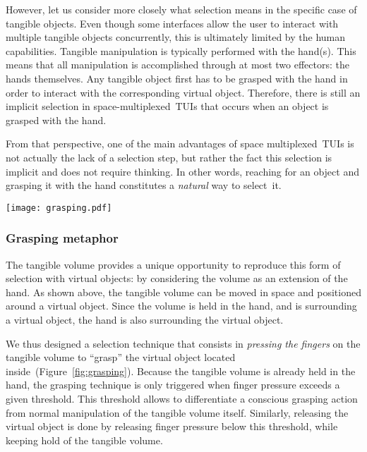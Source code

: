 \documentclass{vgtc}                         \havecopyrightspacefalse
\begin{document}
However, let us consider more closely what selection means in the specific case of tangible objects. Even though some interfaces allow the user to interact with multiple tangible objects concurrently, this is ultimately limited by the human capabilities. Tangible manipulation is typically performed with the hand(s). This means that all manipulation is accomplished through at most two effectors: the hands themselves. Any tangible object first has to be grasped with the hand in order to interact with the corresponding virtual object. Therefore, there is still an implicit selection in space-multiplexed~TUIs that occurs when an object is grasped with the hand.

From that perspective, one of the main advantages of space multiplexed~TUIs is not actually the lack of a selection step, but rather the fact this selection is implicit and does not require thinking. In other words, reaching for an object and grasping it with the hand constitutes a \emph{natural} way to select~it.

\begin{figure*}[t]
  \centering
  \texttt{[image: grasping.pdf]}
  \caption{Illustration of the different steps of object manipulation in our interface concept. First, the tangible volume is positioned onto a virtual object. To disambiguate between nearby objects, an outline indicates which object is both inside the volume and closest to its center. This object can be grasped by pressing the fingers on the volume. The object is then attached to the volume, and can be directly moved alongside the volume in 3D~space. The object is detached when finger pressure is released. If virtual gravity is enabled, it then falls to the ground.}
  \label{fig:grasping}
\end{figure*}

\subsubsection*{Grasping metaphor}

The tangible volume provides a unique opportunity to reproduce this form of selection with virtual objects: by considering the volume as an extension of the hand. As shown above, the tangible volume can be moved in space and positioned around a virtual object. Since the volume is held in the hand, and is surrounding a virtual object, the hand is also surrounding the virtual object.

We thus designed a selection technique that consists in \emph{pressing the fingers} on the tangible volume to ``grasp'' the virtual object located inside~(Figure~\ref{fig:grasping}). Because the tangible volume is already held in the hand, the grasping technique is only triggered when finger pressure exceeds a given threshold. This threshold allows to differentiate a conscious grasping action from normal manipulation of the tangible volume itself. Similarly, releasing the virtual object is done by releasing finger pressure below this threshold, while keeping hold of the tangible volume.
\end{document}
